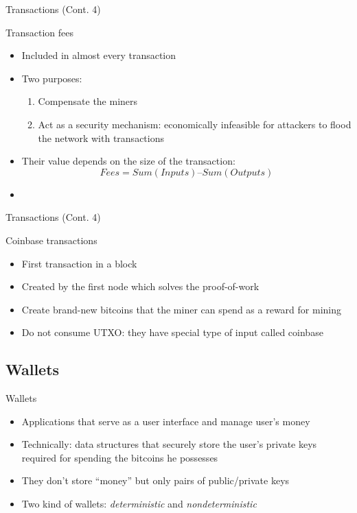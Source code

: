 \documentclass{beamer}
\begin{document}
  \begin{frame}{Transactions (Cont. 4)}
    \begin{block}{Transaction fees}
      \begin{itemize}
        \item Included in almost every transaction \pause
        \item Two purposes:
        \begin{enumerate}
          \item Compensate the miners \pause
          \item Act as a security mechanism: economically infeasible for attackers
          to flood the network with transactions \pause
        \end{enumerate}
        \item Their value depends on the size of the transaction:
        \[ Fees = Sum(Inputs)–Sum(Outputs) \] \pause
        \item
      \end{itemize}
    \end{block}
  \end{frame}





  \begin{frame}{Transactions (Cont. 4)}
    \begin{block}{Coinbase transactions}
      \begin{itemize}
        \item First transaction in a block \pause
        \item Created by the first node which solves the proof-of-work \pause
        \item Create brand-new bitcoins that the miner can spend as a reward for
        mining \pause
        \item Do not consume UTXO: they have special type of input called coinbase
      \end{itemize}
    \end{block}
  \end{frame}





  \subsection{Wallets}
  \begin{frame}{Wallets}
    \begin{itemize}
      \item Applications that serve as a user interface and manage user’s money \pause
      \item Technically: data structures that securely store the user’s private
      keys required for spending the bitcoins he possesses \pause
      \item They don't store ``money'' but only pairs of public/private keys \pause
      \item Two kind of wallets: \emph{deterministic} and \emph{nondeterministic}
    \end{itemize}
  \end{frame}
\end{document}
